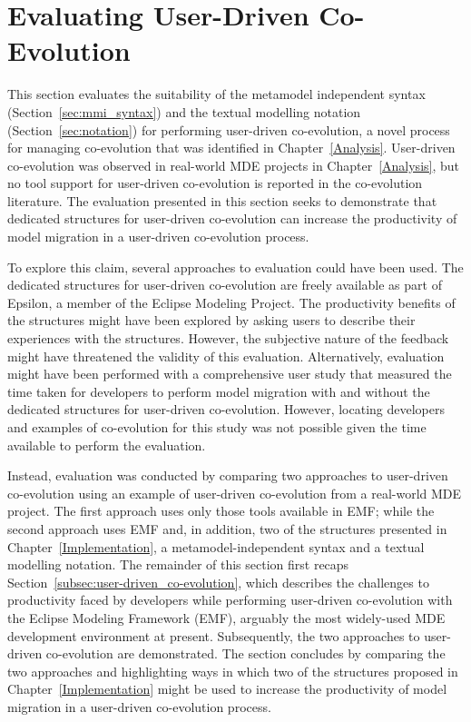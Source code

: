 
\section{Evaluating User-Driven Co-Evolution}
\label{sec:exemplar_user-driven_co-evo}
This section evaluates the suitability of the metamodel independent syntax (Section~\ref{sec:mmi_syntax}) and the textual modelling notation (Section~\ref{sec:notation}) for performing user-driven co-evolution, a novel process for managing co-evolution that was identified in Chapter~\ref{Analysis}. User-driven co-evolution was observed in real-world MDE projects in Chapter~\ref{Analysis}, but no tool support for user-driven co-evolution is reported in the co-evolution literature. The evaluation presented in this section seeks to demonstrate that dedicated structures for user-driven co-evolution can increase the productivity of model migration in a user-driven co-evolution process.

To explore this claim, several approaches to evaluation could have been used. The dedicated structures for user-driven co-evolution are freely available as part of Epsilon, a member of the Eclipse Modeling Project. The productivity benefits of the structures might have been explored by asking users to describe their experiences with the structures. However, the subjective nature of the feedback might have threatened the validity of this evaluation. Alternatively, evaluation might have been performed with a comprehensive user study that measured the time taken for developers to perform model migration with and without the dedicated structures for user-driven co-evolution. However, locating developers and examples of co-evolution for this study was not possible given the time available to perform the evaluation.

Instead, evaluation was conducted by comparing two approaches to user-driven co-evolution using an example of user-driven co-evolution from a real-world MDE project. The first approach uses only those tools available in EMF; while the second approach uses EMF and, in addition, two of the structures presented in Chapter~\ref{Implementation}, a metamodel-independent syntax and a textual modelling notation. The remainder of this section first recaps Section~\ref{subsec:user-driven_co-evolution}, which describes the challenges to productivity faced by developers while performing user-driven co-evolution with the Eclipse Modeling Framework (EMF), arguably the most widely-used MDE development environment at present. Subsequently, the two approaches to user-driven co-evolution are demonstrated. The section concludes by comparing the two approaches and highlighting ways in which two of the structures proposed in Chapter~\ref{Implementation} might be used to increase the productivity of model migration in a user-driven co-evolution process.

